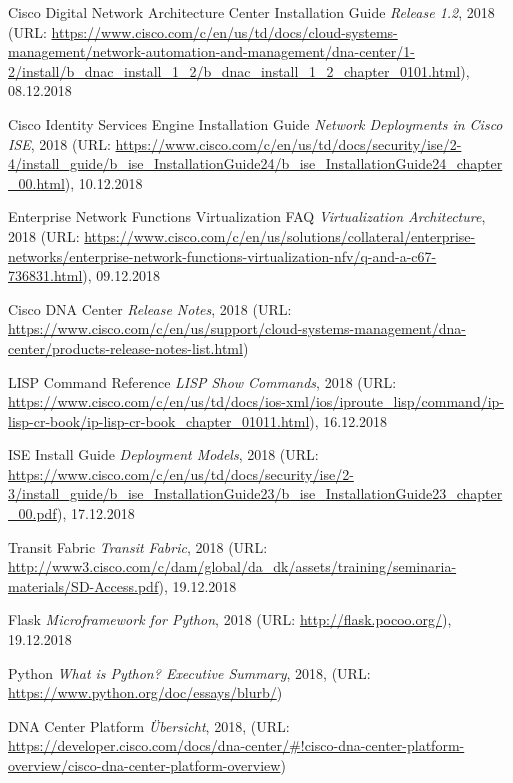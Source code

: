 \begin{thebibliography}{}
	 Cisco Digital Network Architecture Center Installation Guide \textit{Release 1.2}, 2018 (URL: \url{https://www.cisco.com/c/en/us/td/docs/cloud-systems-management/network-automation-and-management/dna-center/1-2/install/b_dnac_install_1_2/b_dnac_install_1_2_chapter_0101.html}), 08.12.2018
	
	 Cisco Identity Services Engine Installation Guide \textit{Network Deployments in Cisco ISE}, 2018 (URL: \url{https://www.cisco.com/c/en/us/td/docs/security/ise/2-4/install_guide/b_ise_InstallationGuide24/b_ise_InstallationGuide24_chapter_00.html}), 10.12.2018

	 Enterprise Network Functions Virtualization FAQ \textit{Virtualization Architecture}, 2018 (URL: \url{https://www.cisco.com/c/en/us/solutions/collateral/enterprise-networks/enterprise-network-functions-virtualization-nfv/q-and-a-c67-736831.html}), 09.12.2018
	
	 Cisco DNA Center \textit{Release Notes}, 2018 (URL: \url{https://www.cisco.com/c/en/us/support/cloud-systems-management/dna-center/products-release-notes-list.html})
	
	 LISP Command Reference \textit{LISP Show Commands}, 2018 (URL: \url{https://www.cisco.com/c/en/us/td/docs/ios-xml/ios/iproute_lisp/command/ip-lisp-cr-book/ip-lisp-cr-book_chapter_01011.html}), 16.12.2018
	
	 ISE Install Guide \textit{Deployment Models}, 2018 (URL: \url{https://www.cisco.com/c/en/us/td/docs/security/ise/2-3/install_guide/b_ise_InstallationGuide23/b_ise_InstallationGuide23_chapter_00.pdf}), 17.12.2018	
	
	 Transit Fabric \textit{Transit Fabric}, 2018 (URL: \url{http://www3.cisco.com/c/dam/global/da_dk/assets/training/seminaria-materials/SD-Access.pdf}), 19.12.2018	
	
	 Flask \textit{Microframework for Python}, 2018 (URL: \url{http://flask.pocoo.org/}), 19.12.2018
	
	 Python \textit{What is Python? Executive Summary}, 2018, (URL: \url{https://www.python.org/doc/essays/blurb/})
	
	 DNA Center Platform \textit{Übersicht}, 2018, (URL: \url{https://developer.cisco.com/docs/dna-center/#!cisco-dna-center-platform-overview/cisco-dna-center-platform-overview})
	
\end{thebibliography}
